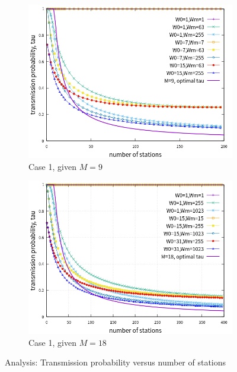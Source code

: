 \begin{figure}[!t]
\centering
\begin{subfigure}{\textwidth}
\centering
\includegraphics[scale=.85]{./figure/chp4/M9/n_tau_perf_M9_x200.png}
\caption{Case 1, given $M=9$}
\label{fig_tau_n_M9}
\end{subfigure}
\begin{subfigure}{\textwidth}
\centering
\includegraphics[scale=.85]{./figure/chp4/M18/n_tau_perf_M18_x400.png}
\caption{Case 1, given $M=18$}
\label{fig_tau_n_M18}
\end{subfigure}
\caption{Analysis: Transmission probability versus number of stations}
\label{fig_tau_n}
\end{figure}

